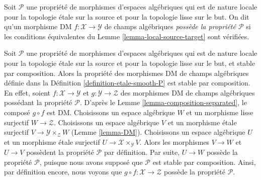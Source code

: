 \begin{definition}
\label{definition-etale-smooth-P}
Soit $\mathcal{P}$ une propriété de morphismes d'espaces algébriques
qui est de nature locale pour la topologie \'etale sur la source et pour la topologie lisse sur le but.
On dit qu'un morphisme DM $f : \mathcal{X} \to \mathcal{Y}$ de champs algébriques
{\it possède la propriété $\mathcal{P}$} si les conditions équivalentes du
Lemme \ref{lemma-local-source-target}
sont vérifiées.
\end{definition}

\begin{remark}
\label{remark-etale-smooth-composition}
Soit $\mathcal{P}$ une propriété de morphismes d'espaces algébriques
qui est de nature locale pour la topologie \'etale sur la source et pour la topologie lisse sur le but, et
stable par composition. Alors la propriété des morphismes DM de champs algébriques
définie dans la Définition \ref{definition-etale-smooth-P}
est stable par composition. En effet, soient $f : \mathcal{X} \to \mathcal{Y}$
et $g : \mathcal{Y} \to \mathcal{Z}$ des morphismes DM de champs algébriques
possédant la propriété $\mathcal{P}$. D'après le Lemme \ref{lemma-composition-separated},
le composé $g \circ f$ est DM. Choisissons un espace algébrique $W$ et un
morphisme lisse surjectif $W \to \mathcal{Z}$. Choisissons un espace algébrique
$V$ et un morphisme \'etale surjectif $V \to \mathcal{Y} \times_\mathcal{Z} W$
(Lemme \ref{lemma-DM}).
Choisissons un espace algébrique $U$ et un morphisme \'etale surjectif
$U \to \mathcal{X} \times_\mathcal{Y} V$. Alors les morphismes
$V \to W$ et $U \to V$ possèdent la propriété $\mathcal{P}$ par définition.
Par suite, $U \to W$ possède la propriété $\mathcal{P}$, puisque nous avons supposé que
$\mathcal{P}$ est stable par composition. Ainsi, par définition encore,
nous voyons que $g \circ f : \mathcal{X} \to \mathcal{Z}$ possède la
propriété $\mathcal{P}$.
\end{remark}

